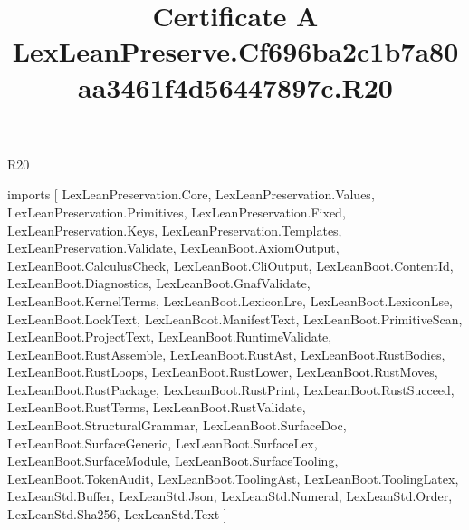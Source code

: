 \begin{lexlean}{R20}
\title{Certificate A LexLeanPreserve.Cf696ba2c1b7a80aa3461f4d56447897c.R20}
\begin{coremodule}
imports [
  LexLeanPreservation.Core,
  LexLeanPreservation.Values,
  LexLeanPreservation.Primitives,
  LexLeanPreservation.Fixed,
  LexLeanPreservation.Keys,
  LexLeanPreservation.Templates,
  LexLeanPreservation.Validate,
  LexLeanBoot.AxiomOutput,
  LexLeanBoot.CalculusCheck,
  LexLeanBoot.CliOutput,
  LexLeanBoot.ContentId,
  LexLeanBoot.Diagnostics,
  LexLeanBoot.GnafValidate,
  LexLeanBoot.KernelTerms,
  LexLeanBoot.LexiconLre,
  LexLeanBoot.LexiconLse,
  LexLeanBoot.LockText,
  LexLeanBoot.ManifestText,
  LexLeanBoot.PrimitiveScan,
  LexLeanBoot.ProjectText,
  LexLeanBoot.RuntimeValidate,
  LexLeanBoot.RustAssemble,
  LexLeanBoot.RustAst,
  LexLeanBoot.RustBodies,
  LexLeanBoot.RustLoops,
  LexLeanBoot.RustLower,
  LexLeanBoot.RustMoves,
  LexLeanBoot.RustPackage,
  LexLeanBoot.RustPrint,
  LexLeanBoot.RustSucceed,
  LexLeanBoot.RustTerms,
  LexLeanBoot.RustValidate,
  LexLeanBoot.StructuralGrammar,
  LexLeanBoot.SurfaceDoc,
  LexLeanBoot.SurfaceGeneric,
  LexLeanBoot.SurfaceLex,
  LexLeanBoot.SurfaceModule,
  LexLeanBoot.SurfaceTooling,
  LexLeanBoot.TokenAudit,
  LexLeanBoot.ToolingAst,
  LexLeanBoot.ToolingLatex,
  LexLeanStd.Buffer,
  LexLeanStd.Json,
  LexLeanStd.Numeral,
  LexLeanStd.Order,
  LexLeanStd.Sha256,
  LexLeanStd.Text
]


\end{coremodule}
\end{lexlean}
